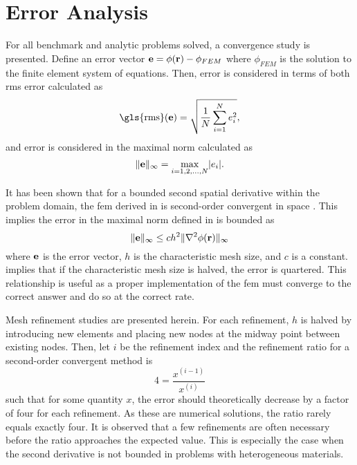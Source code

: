\section{Error Analysis}
  For all benchmark and analytic problems solved, a convergence study is 
  presented. Define an error vector $\mathbf{e} = \phi(\mathbf{r}) - \phi_{FEM}$ where
  $\phi_{FEM}$ is the solution to the finite element system of equations. Then, 
  error is considered in terms of both \gls{rms} error calculated as 
  \begin{equation} 
    \label{eq:rms}
    \text{\gls{rms}}(\ve) = \sqrt{\frac{1}{N} \sum_{i=1}^{N} e_i^2},
  \end{equation}
  and error is considered in the maximal norm calculated as
  \begin{equation} 
    \label{eq:infnorm}
    \|\mathbf{e}\|_{\infty} = \max_{i=1,2,\ldots,N} \lvert e_i \rvert.
  \end{equation}

  It has been shown that for a bounded second spatial derivative 
  within the problem domain, the \gls{fem} derived in 
   is second-order convergent in space 
  \cite{textbookli}. This implies the error in the maximal norm defined in 
   is bounded as
  \begin{equation} 
    \label{eq:error_bound}
    \|\mathbf{e}\|_{\infty} \le c h^2 \| \mathbf{\nabla}^2 \phi(\mathbf{r}) \|_{\infty}
  \end{equation}
  where $\mathbf{e}$ is the error vector, $h$ is the characteristic mesh size, and $c$
  is a constant.  implies that if the characteristic mesh 
  size is halved, the error is quartered. This relationship is useful as a 
  proper implementation of the \gls{fem} must converge to the correct answer and 
  do so at the correct rate.
  
  Mesh refinement studies are presented herein. For each refinement, $h$ is 
  halved by introducing new elements and placing new nodes at the midway point
  between existing nodes. Then, let $i$ be the refinement index and the
  refinement ratio for a second-order convergent method is 
  \begin{equation}
    4 = \frac{x^{(i-1)}}{x^{(i)}}
  \end{equation}
  such that for some quantity $x$, the error should theoretically decrease by a
  factor of four for each refinement. As these are numerical solutions, the 
  ratio rarely equals exactly four. It is observed that a few refinements are 
  often necessary before the ratio approaches the expected value. This is 
  especially the case when the second derivative is not bounded in problems with 
  heterogeneous materials.
  
